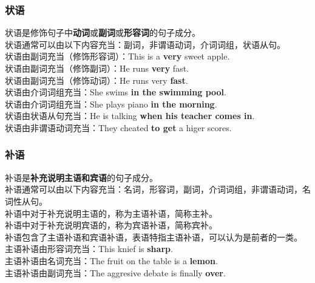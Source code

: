 \documentclass[UTF8]{ctexart}
\begin{document}
\subsubsection{状语}
    状语是修饰句子中\textbf{动词}或\textbf{副词}或\textbf{形容词}的句子成分。\\[3mm]
    状语通常可以由以下内容充当：副词，非谓语动词，介词词组，状语从句。\\[6mm]
    状语由副词充当（修饰形容词）：This is a \textbf{very} sweet apple.\\[3mm]
    状语由副词充当（修饰副词）：He runs \textbf{very} fast.\\[3mm]
    状语由副词充当（修饰动词）：He runs very \textbf{fast}.\\[3mm]
    状语由介词词组充当：She swims \textbf{in the swimming pool}.\\[3mm]
    状语由介词词组充当：She plays piano \textbf{in the morning}.\\[3mm]
    状语由状语从句充当：He is talking \textbf{when his teacher comes in}.\\[3mm]
    状语由非谓语动词充当：They cheated \textbf{to get} a higer scores.

\newpage

\subsubsection{补语}
    补语是\textbf{补充说明主语和宾语}的句子成分。\\[3mm]
    补语通常可以由以下内容充当：名词，形容词，副词，介词词组，非谓语动词，名词性从句。\\[3mm]
    补语中对于补充说明主语的，称为主语补语，简称主补。\\[3mm]
    补语中对于补充说明宾语的，称为宾语补语，简称宾补。\\[3mm]
    补语包含了主语补语和宾语补语，表语特指主语补语，可以认为是前者的一类。\\[6mm]
    主语补语由形容词充当：This knief is \textbf{sharp}.\\[3mm]
    主语补语由名词充当：The fruit on the table is a \textbf{lemon}.\\[3mm]
    主语补语由副词充当：The aggresive debate is finally \textbf{over}.\\[3mm]
\end{document}
